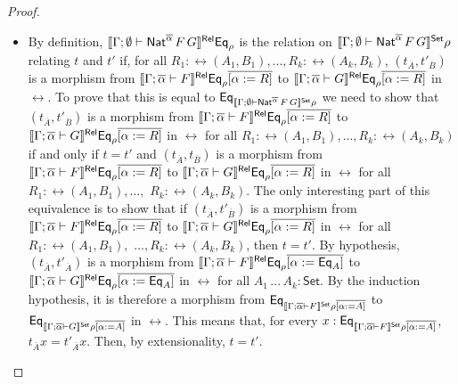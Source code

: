 \documentclass[acmsmall,review,anonymous]{acmart}
\theoremstyle{definition}
\newcommand{\set}{\mathsf{Set}}
\begin{document}
\begin{proof}
\begin{itemize}
\item
By definition, $\llbracket{\Gamma; \emptyset \vdash
  \mathsf{Nat}^{\overline\alpha} \,F\,G}\rrbracket^{\mathsf{Rel}} \mathsf{Eq}_{\rho}$ is the relation on
  $\setsem{\Gamma; \emptyset \vdash \Nat^{\overline\alpha} \,F\,G}
  \rho$ relating $t$ and $t'$ if, for all ${R_1 :
    \rel(A_1,B_1)},...,{R_k : \rel(A_k,B_k)}$, $(t_{\overline{A}},
  t'_{\overline{B}})$ is a morphism from $\llbracket{\Gamma;
    \overline\alpha \vdash F}\rrbracket^{\mathsf{Rel}} \mathsf{Eq}_{\rho}\overline{[\alpha := R]}$ to
  $\llbracket{\Gamma ; \overline\alpha \vdash G}\rrbracket^{\mathsf{Rel}}
  \mathsf{Eq}_{\rho}\overline{[\alpha := R]}$ in $\rel$.  To prove that this
  is equal to $\Eq_{\setsem{\Gamma; \emptyset \vdash
      \Nat^{\overline\alpha} \,F\,G} \rho}$ we need to show that
  $(t_{\overline{A}}, t'_{\overline{B}})$ is a morphism from
  $\llbracket{\Gamma; \overline\alpha \vdash F}\rrbracket^{\mathsf{Rel}}
  \mathsf{Eq}_{\rho}\overline{[\alpha := R]}$ to $\llbracket{\Gamma ;
  \overline\alpha \vdash G}\rrbracket^{\mathsf{Rel}} \mathsf{Eq}_{\rho}\overline{[\alpha := R]}$ in
  $\rel$ for all ${R_1 : \rel(A_1,B_1)},...,{R_k : \rel(A_k,B_k)}$ if
  and only if $t = t'$ and $(t_{\overline{A}}, t_{\overline{B}})$ is a
  morphism from $\llbracket{\Gamma; \overline\alpha \vdash F}\rrbracket^{\mathsf{Rel}}
  \mathsf{Eq}_{\rho}\overline{[\alpha := R]}$ to $\llbracket{\Gamma ; \overline
    \alpha \vdash G}\rrbracket^{\mathsf{Rel}} \mathsf{Eq}_{\rho}\overline{[\alpha := R]}$ in $\rel$ for
  all ${R_1 : \rel(A_1,B_1)}, ...,$ ${R_k : \rel(A_k,B_k)}$. The only
  interesting part of this equivalence is to show that if
  $(t_{\overline{A}}, t'_{\overline{B}})$ is a morphism from
  $\llbracket{\Gamma; \overline\alpha \vdash F}\rrbracket^{\mathsf{Rel}}
  \mathsf{Eq}_{\rho}\overline{[\alpha := R]}$ to $\llbracket{\Gamma ;
    \overline\alpha \vdash G}\rrbracket^{\mathsf{Rel}} \mathsf{Eq}_{\rho}\overline{[\alpha := R]}$ in
  $\rel$ for all ${R_1 : \rel(A_1,B_1),}$ $...,{R_k : \rel(A_k,B_k)}$,
  then $t = t'$.  By hypothesis, $(t_{\overline{A}},
  t'_{\overline{A}})$ is a morphism from $\llbracket{\Gamma;
    \overline\alpha \vdash F}\rrbracket^{\mathsf{Rel}} \mathsf{Eq}_{\rho}\overline{[\alpha :=
      \mathsf{Eq}_{A}]}$ to $\llbracket{\Gamma ; \overline\alpha \vdash G}\rrbracket^{\mathsf{Rel}}
  \mathsf{Eq}_{\rho}\overline{[\alpha := \mathsf{Eq}_{A}]}$ in $\rel$ for all
  $A_1\,...\,A_k : \set$. By the induction hypothesis, it is therefore
  a morphism from $\Eq_{\setsem{\Gamma; \overline\alpha \vdash F}
    \rho\overline{[\alpha := A]}}$ to $\Eq_{\setsem{\Gamma;
      \overline\alpha \vdash G} \rho\overline{[\alpha := A]}}$ in
  $\rel$. This means that, for every $x : \Eq_{\setsem{\Gamma;
      \overline\alpha \vdash F} \rho\overline{[\alpha := A]}}$,
  $t_{\overline{A}}x = t'_{\overline{A}}x$.  Then, by extensionality,
  $t = t'$.


\end{itemize}
\end{proof}
\end{document}
